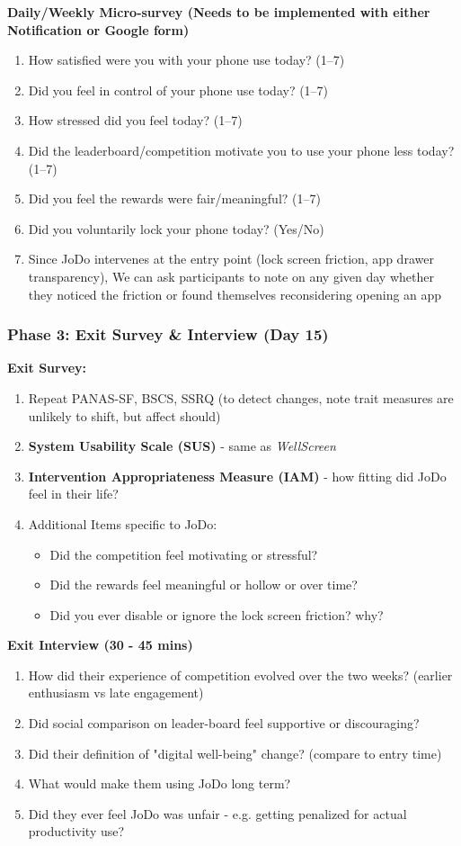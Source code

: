 \documentclass[12pt]{article}
\begin{document}
\textbf{Daily/Weekly Micro-survey (Needs to be implemented with either Notification or Google form)}
\begin{enumerate}
    \item How satisfied were you with your phone use today? (1–7)
    \item Did you feel in control of your phone use today? (1–7)
    \item How stressed did you feel today? (1–7)
    \item Did the leaderboard/competition motivate you to use your phone less today? (1–7)
    \item Did you feel the rewards were fair/meaningful? (1–7)
    \item Did you voluntarily lock your phone today? (Yes/No)
    \item Since JoDo intervenes at the entry point (lock screen friction, app drawer transparency), We can ask participants to note on any given day whether they noticed the friction or found themselves reconsidering opening an app
\end{enumerate}
\subsubsection{Phase 3: Exit Survey \& Interview (Day 15)
}
\textbf{Exit Survey: }
\begin{enumerate}
    \item Repeat PANAS-SF, BSCS, SSRQ (to detect changes, note trait measures are unlikely to shift, but affect should)
    \item \textbf{System Usability Scale (SUS)} - same as \textit{WellScreen}
    \item \textbf{Intervention Appropriateness Measure (IAM)} - how fitting did JoDo feel in their life?
    \item Additional Items specific to JoDo:
    \begin{itemize}
        \item Did the competition feel motivating or stressful?
        \item Did the rewards feel meaningful or hollow or over time?
        \item Did you ever disable or ignore the lock screen friction? why?
    \end{itemize}
\end{enumerate}
\textbf{Exit Interview (30 - 45 mins)}
\begin{enumerate}
    \item How did their experience of competition evolved over the two weeks? (earlier enthusiasm vs late engagement)
    \item Did social comparison on leader-board feel supportive or discouraging?
    \item Did their definition of "digital well-being" change? (compare to entry time)
    \item What would make them using JoDo long term?
    \item Did they ever feel JoDo was unfair - e.g. getting penalized for actual productivity use?
\end{enumerate}
\end{document}
